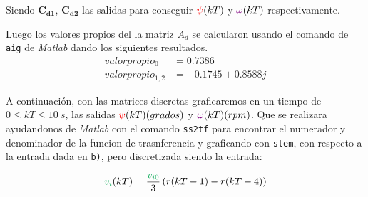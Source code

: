 Siendo $\pmb{C_{d1}} $, $\pmb{C_{d2}} $ las salidas para conseguir $\mathbin{\color{red}\psi}(kT)$ y $\mathbin{\color{violet}\omega}(kT)$ respectivamente.

Luego los valores propios del la matriz $A_d$ se calcularon usando el comando de \texttt{aig} de \textit{Matlab} dando los siguientes resultados.
\begin{align}
  valor propio_{0} &=  0.7386 \\
  valor propio_{1,2} &=  -0.1745 \pm 0.8588j
\end{align}

A continuación, con las matrices discretas  graficaremos en un tiempo de $0 \leq kT \leq 10\ \unit{s}$, las salidas $ \mathbin{\color{red}\psi}(kT)(grados) $ y $ \mathbin{\color{violet}\omega}(kT)(rpm) $. Que se realizara ayudandonos de \textit{Matlab} con el comando \texttt{ss2tf}  para encontrar el numerador y denominador de la funcion de trasnferencia  y graficando con  \texttt{stem},  con respecto a la entrada dada en \hyperref[pregunta-b]{\texttt{b)}}, pero discretizada siendo la entrada:

\begin{equation}
  \verd{v_{i}}(kT) = \frac{\verd{v_{i0}}}{3}\left(r(kT-1) - r(kT-4)\right)
\end{equation}








